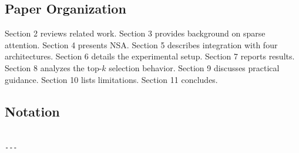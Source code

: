 \subsection{Paper Organization}

Section 2 reviews related work. Section 3 provides background on sparse 
attention. Section 4 presents NSA. Section 5 describes integration with four 
architectures. Section 6 details the experimental setup. Section 7 reports 
results. Section 8 analyzes the top-$k$ selection behavior. Section 9 
discusses practical guidance. Section 10 lists limitations. Section 11 
concludes.



\subsection{Notation}

\begin{lstlisting}

---
\end{lstlisting}